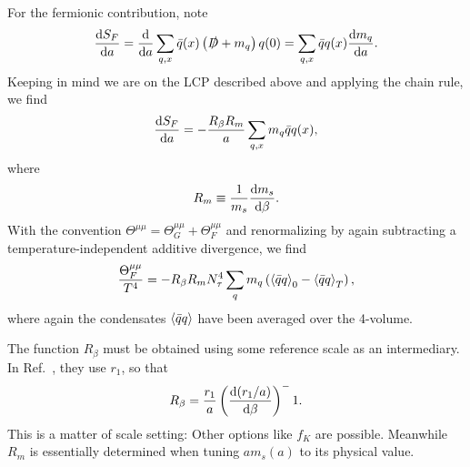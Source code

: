 For the fermionic contribution, note
\begin{equation}
\dv{S_F}{a}
=\frac{\dd}{\dd a}\sum_{q,x} \bar{q}(x)\left(\slashed{D}+m_q\right)q(0)
=\sum_{q,x} \bar{q}q(x) \dv{m_q}{a}.
\end{equation}
Keeping in mind we are on the LCP described above and applying the chain rule,
we find
\begin{equation}
\dv{S_F}{a}
=-\frac{R_\beta R_m}{a}\sum_{q,x} m_q \bar{q}q(x), 
\end{equation}
where
\begin{equation}
R_m\equiv\frac{1}{m_s}\dv{m_s}{\beta}.
\end{equation}
With the convention $\Theta^{\mu\mu}=\Theta^{\mu\mu}_G+\Theta^{\mu\mu}_F$
and renormalizing by again subtracting a temperature-independent additive
divergence, we find
\begin{equation}
\frac{\Theta^{\mu\mu}_F}{T^4}=-R_\beta R_mN_\tau^4
\sum_q m_q\left(\ev{\bar{q}q}_0-\ev{\bar{q}q}_T\right),
\end{equation}
where again the condensates $\ev{\bar{q}q}$ have been averaged over
the 4-volume.

The function $R_\beta$ must be obtained using some reference scale as an
intermediary. In Ref.~\cite{bazavov_equation_2014}, they use $r_1$, so
that
\begin{equation}
R_\beta=\frac{r_1}{a}\left(\dv{(r_1/a)}{\beta}\right)^-1.
\end{equation}
This is a matter of scale setting: Other options like $f_K$ are possible.
Meanwhile $R_m$ is essentially determined when tuning $am_s(a)$ to its
physical value. 



